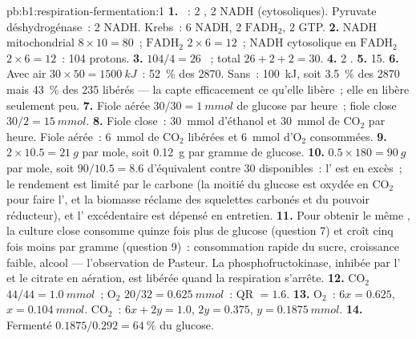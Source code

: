 \begin{solution}{pb:b1:respiration-fermentation:1}
\textbf{1.} ~: 2 , 2 NADH (cytosoliques). Pyruvate
déshydrogénase~: 2 NADH. Krebs~: 6 NADH, 2 $\mathrm{FADH_2}$, 2 GTP.
\textbf{2.} NADH mitochondrial $8\times 10 = 80$~; $\mathrm{FADH_2}$
$2\times 6 = 12$~; NADH cytosolique en $\mathrm{FADH_2}$ $2\times 6 = 12$~:
104 protons.
\textbf{3.} $104/4 = 26$ ~; total $26 + 2 + 2 = 30$.
\textbf{4.} 2 .
\textbf{5.} 15.
\textbf{6.} Avec air $30\times 50 = \qty{1500}{kJ}$~: \qty{52}{\%} des
2870. Sans~: \qty{100}{kJ}, soit \qty{3.5}{\%} des 2870 mais
\qty{43}{\%} des 235 libérés --- la  capte efficacement ce
qu'elle libère~; elle en libère seulement peu.
\textbf{7.} Fiole aérée $30/30 = \qty{1}{mmol}$ de glucose par heure~;
fiole close $30/2 = \qty{15}{mmol}$.
\textbf{8.} Fiole close~: \qty{30}{mmol} d'éthanol et \qty{30}{mmol} de
$\mathrm{CO_2}$ par heure. Fiole aérée~: \qty{6}{mmol} de
$\mathrm{CO_2}$ libérées et \qty{6}{mmol} d'$\mathrm{O_2}$ consommées.
\textbf{9.} $2\times 10.5 = \qty{21}{g}$ par mole, soit \qty{0.12}{g}
par gramme de glucose.
\textbf{10.} $0.5\times 180 = \qty{90}{g}$ par mole, soit $90/10.5 =
8.6$  d'équivalent contre 30 disponibles~: l' est en excès~; le
rendement est limité par le carbone (la moitié du glucose est oxydée en
$\mathrm{CO_2}$ pour faire l', et la biomasse réclame des squelettes
carbonés et du pouvoir réducteur), et l' excédentaire est dépensé en
entretien.
\textbf{11.} Pour obtenir le même , la culture close consomme quinze
fois plus de glucose (question 7) et croît cinq fois moins par gramme
(question 9)~: consommation rapide du sucre, croissance faible, alcool
--- l'observation de Pasteur. La phosphofructokinase, inhibée par l'
et le citrate en aération, est libérée quand la respiration s'arrête.
\textbf{12.} $\mathrm{CO_2}$ $44/44 = \qty{1.0}{mmol}$~; $\mathrm{O_2}$
$20/32 = \qty{0.625}{mmol}$~: QR $= 1.6$.
\textbf{13.} $\mathrm{O_2}$~: $6x = 0.625$, $x = \qty{0.104}{mmol}$.
$\mathrm{CO_2}$~: $6x + 2y = 1.0$, $2y = 0.375$, $y = \qty{0.1875}{mmol}$.
\textbf{14.} Fermenté $0.1875/0.292 = \qty{64}{\%}$ du glucose. 

\end{solution}
